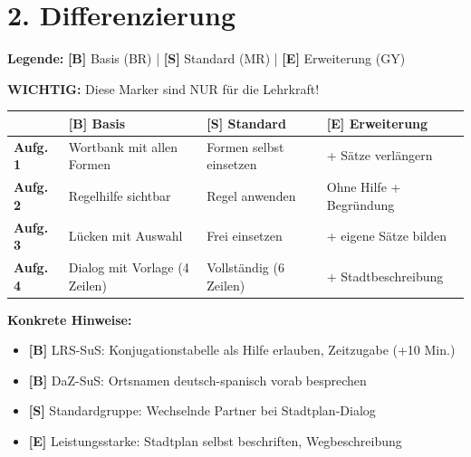 \documentclass[11pt, a4paper]{article}
\newcommand{\B}{\textcolor{basis}{\textbf{[B]}}}
\newcommand{\Std}{\textcolor{standard}{\textbf{[S]}}}
\newcommand{\E}{\textcolor{erweiterung}{\textbf{[E]}}}
\begin{document}

\section*{2. Differenzierung}

\begin{differenzierung}
\textbf{Legende:} \B{} Basis (BR) | \Std{} Standard (MR) | \E{} Erweiterung (GY)

\vspace{0.5em}
\textbf{WICHTIG:} Diese Marker sind NUR für die Lehrkraft!
\end{differenzierung}

\vspace{1em}

\begin{tabularx}{\textwidth}{|l|X|X|X|}
\hline
& \B{} \textbf{Basis} & \Std{} \textbf{Standard} & \E{} \textbf{Erweiterung} \\
\hline
\textbf{Aufg. 1} & Wortbank mit allen Formen & Formen selbst einsetzen & + Sätze verlängern \\
\hline
\textbf{Aufg. 2} & Regelhilfe sichtbar & Regel anwenden & Ohne Hilfe + Begründung \\
\hline
\textbf{Aufg. 3} & Lücken mit Auswahl & Frei einsetzen & + eigene Sätze bilden \\
\hline
\textbf{Aufg. 4} & Dialog mit Vorlage (4 Zeilen) & Vollständig (6 Zeilen) & + Stadtbeschreibung \\
\hline
\end{tabularx}

\vspace{1em}

\textbf{Konkrete Hinweise:}
\begin{itemize}
    \item \B{} LRS-SuS: Konjugationstabelle als Hilfe erlauben, Zeitzugabe (+10 Min.)
    \item \B{} DaZ-SuS: Ortsnamen deutsch-spanisch vorab besprechen
    \item \Std{} Standardgruppe: Wechselnde Partner bei Stadtplan-Dialog
    \item \E{} Leistungsstarke: Stadtplan selbst beschriften, Wegbeschreibung
\end{itemize}

\end{document}
